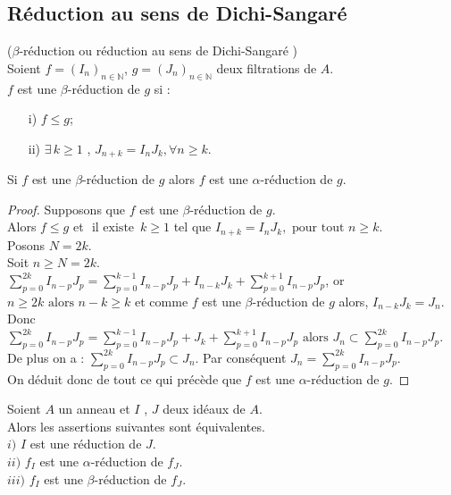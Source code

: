 \subsection{Réduction au sens de Dichi-Sangaré}
\begin{madefinition}
	($\beta$-réduction ou réduction au sens de Dichi-Sangaré \cite{Di4})\\
	Soient $f = (I_n)_{n \in \mathbb{N}}$, $g = (J_n)_{n \in \mathbb{N}}$ deux filtrations de $A$.\\
	$f$ est une $\beta$-réduction de $g$ si :
	\begin{enumerate}
		\item[i)] $f \leq g$;
		\item[ii)]  $\exists \, k \geq 1$ , $J_{n+k} = I_n J_k , \forall n \geq k$.
	\end{enumerate}
\end{madefinition}
\begin{maremarque}
	Si $f$ est une $\beta$-réduction de $g$ alors $f$ est une $\alpha$-réduction de $g$.	
\end{maremarque}
\begin{proof}
	Supposons que $f$ est une $\beta$-réduction de $g$.\\
	Alors $f \leq g$ et $\text{ il existe } \, k \geq 1$ tel que $I_{n+k} = I_n J_k , \text{ pour tout } n \geq k$.\\
	Posons $N = 2k$.\\
	Soit $n \geq N= 2k$.\\
	$\displaystyle \sum_{p=0}^{2k}{I_{n-p} J_{p}} = \displaystyle \sum_{p=0}^{k-1}{I_{n-p} J_{p}} + I_{n-k} J_k + \displaystyle \sum_{p=0}^{k+1}{I_{n-p} J_{p}}$, or $n \geq  2k \text{ alors } n-k \geq k$ et comme $f$ est une $\beta$-réduction de $g$ alors, $I_{n-k} J_k = J_n$.\\
	Donc $\displaystyle \sum_{p=0}^{2k}{I_{n-p} J_{p}} = \displaystyle \sum_{p=0}^{k-1}{I_{n-p} J_{p}} + J_k + \displaystyle \sum_{p=0}^{k+1}{I_{n-p} J_{p}} \text{ alors } J_n \subset \displaystyle \sum_{p=0}^{2k}{I_{n-p} J_{p}}$.\\
	De plus on a : $\displaystyle \sum_{p=0}^{2k}{I_{n-p} J_{p}} \subset J_n$. 
	Par conséquent $J_n = \displaystyle \sum_{p=0}^{2k}{I_{n-p} J_{p}}$.\\
	On déduit donc de tout ce qui précède que $f$ est une $\alpha$-réduction de $g$.
\end{proof}
\begin{maproposition}
	Soient $A$ un anneau et $I$ , $J$ deux idéaux de $A$.\\
	Alors les assertions suivantes sont équivalentes.\\
	$i)$ $I$ est une réduction de $J$.\\
	$ii)$ $f_I$ est une $\alpha$-réduction de $f_J$.\\
	$iii)$ $f_I$ est une $\beta$-réduction de $f_J$.
\end{maproposition}
